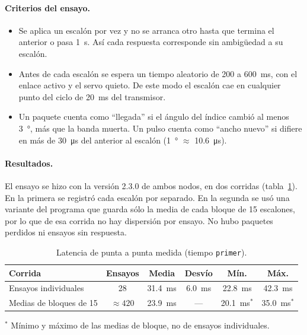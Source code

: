 \paragraph{Criterios del ensayo.}
\begin{itemize}
    \item Se aplica un escalón por vez y no se arranca otro hasta que termina el anterior o pasa \SI{1}{\second}. Así cada respuesta corresponde sin ambigüedad a su escalón.
    \item Antes de cada escalón se espera un tiempo aleatorio de 200 a \SI{600}{\milli\second}, con el enlace activo y el servo quieto. De este modo el escalón cae en cualquier punto del ciclo de \SI{20}{\milli\second} del transmisor.
    \item Un paquete cuenta como ``llegada'' si el ángulo del índice cambió al menos \SI{3}{\degree}, más que la banda muerta. Un pulso cuenta como ``ancho nuevo'' si difiere en más de \SI{30}{\micro\second} del anterior al escalón (\SI{1}{\degree} $\approx$ \SI{10.6}{\micro\second}).
\end{itemize}

\paragraph{Resultados.} El ensayo se hizo con la versión 2.3.0 de ambos nodos, en dos corridas (tabla~\ref{tab:latencia_medida}). En la primera se registró cada escalón por separado. En la segunda se usó una variante del programa que guarda sólo la media de cada bloque de 15 escalones, por lo que de esa corrida no hay dispersión por ensayo. No hubo paquetes perdidos ni ensayos sin respuesta.

\begin{table}[H]
\centering
\begin{tabular}{l c c c c c}
\toprule
\textbf{Corrida} & \textbf{Ensayos} & \textbf{Media} & \textbf{Desvío} & \textbf{Mín.} & \textbf{Máx.} \\
\midrule
Ensayos individuales & 28 & \SI{31.4}{\milli\second} & \SI{6.0}{\milli\second} & \SI{22.8}{\milli\second} & \SI{42.3}{\milli\second} \\
Medias de bloques de 15 & $\approx 420$ & \SI{23.9}{\milli\second} & --- & \SI{20.1}{\milli\second}$^{*}$ & \SI{35.0}{\milli\second}$^{*}$ \\
\bottomrule
\end{tabular}

\smallskip
{\footnotesize $^{*}$ Mínimo y máximo de las medias de bloque, no de ensayos individuales.}
\caption{Latencia de punta a punta medida (tiempo \texttt{primer}).}
\label{tab:latencia_medida}
\end{table}

